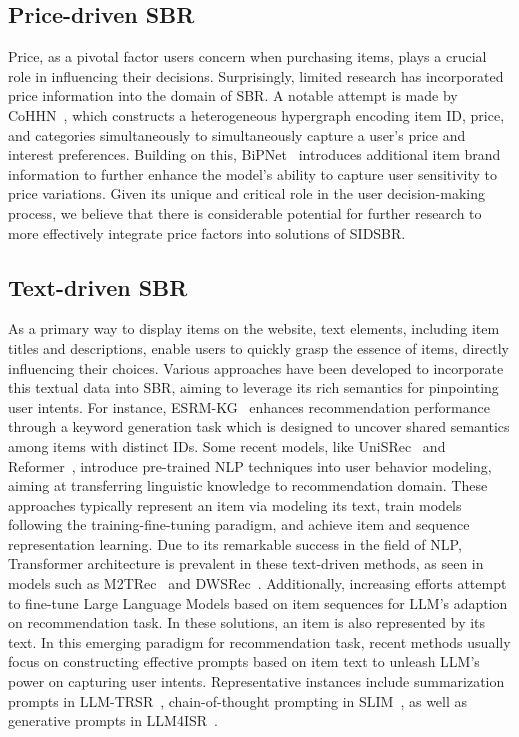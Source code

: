 \documentclass[lettersize,journal]{IEEEtran}
\newcommand{\baby}{{SIDSBR}\xspace}
\begin{document}
\subsection{Price-driven SBR}\label{pricesbr}
Price, as a pivotal factor users concern when purchasing items, plays a crucial role in influencing their decisions. Surprisingly, limited research has incorporated price information into the domain of SBR. A notable attempt is made by CoHHN~\cite{CoHHN}, which constructs a heterogeneous hypergraph encoding item ID, price, and categories simultaneously to simultaneously capture a user's price and interest preferences. Building on this, BiPNet~\cite{BiPNet} introduces additional item brand information to further enhance the model’s ability to capture user sensitivity to price variations. Given its unique and critical role in the user decision-making process, we believe that there is considerable potential for further research to more effectively integrate price factors into solutions of \baby.

\subsection{Text-driven SBR}\label{textsbr}
As a primary way to display items on the website, text elements, including item titles and descriptions, enable users to quickly grasp the essence of items, directly influencing their choices. Various approaches have been developed to incorporate this textual data into SBR, aiming to leverage its rich semantics for pinpointing user intents. For instance, ESRM-KG~\cite{liu@WWW2020} enhances recommendation performance through a keyword generation task which is designed to uncover shared semantics among items with distinct IDs. Some recent models, like UniSRec~\cite{hou@KDD2022} and Reformer~\cite{Li@KDD2023}, introduce pre-trained NLP techniques into user behavior modeling, aiming at transferring linguistic knowledge to recommendation domain. These approaches typically represent an item via modeling its text, train models following the training-fine-tuning paradigm, and achieve item and sequence representation learning. Due to its remarkable success in the field of NLP, Transformer architecture is prevalent in these text-driven methods, as seen in models such as M2TRec~\cite{Shalaby@RecSys2022} and DWSRec~\cite{Zhang@AAAI2024}. Additionally, increasing efforts attempt to fine-tune Large Language Models based on item sequences for LLM's adaption on recommendation task. In these solutions, an item is also represented by its text. In this emerging paradigm for recommendation task, recent methods usually focus on constructing effective prompts based on item text to unleash LLM's power on capturing user intents. Representative instances include summarization prompts in LLM-TRSR~\cite{Zheng@WWW2024}, chain-of-thought prompting in SLIM~\cite{Wang@WWW2024LLM}, as well as generative prompts in LLM4ISR~\cite{Sun@SIGIR2024}.
\end{document}
